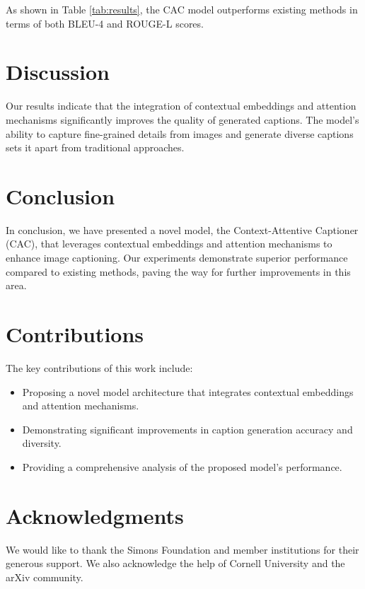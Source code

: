 \documentclass{article}
\begin{document}
As shown in Table \ref{tab:results}, the CAC model outperforms existing methods in terms of both BLEU-4 and ROUGE-L scores.

\section{Discussion}
Our results indicate that the integration of contextual embeddings and attention mechanisms significantly improves the quality of generated captions. The model’s ability to capture fine-grained details from images and generate diverse captions sets it apart from traditional approaches.

\section{Conclusion}
In conclusion, we have presented a novel model, the Context-Attentive Captioner (CAC), that leverages contextual embeddings and attention mechanisms to enhance image captioning. Our experiments demonstrate superior performance compared to existing methods, paving the way for further improvements in this area.

\section{Contributions}
The key contributions of this work include:
\begin{itemize}
    \item Proposing a novel model architecture that integrates contextual embeddings and attention mechanisms.
    \item Demonstrating significant improvements in caption generation accuracy and diversity.
    \item Providing a comprehensive analysis of the proposed model's performance.
\end{itemize}

\section*{Acknowledgments}
We would like to thank the Simons Foundation and member institutions for their generous support. We also acknowledge the help of Cornell University and the arXiv community.



\end{document}
